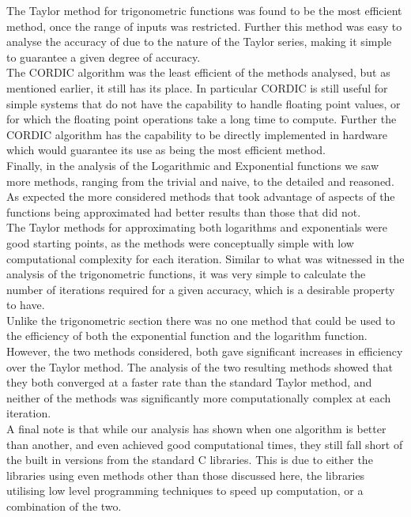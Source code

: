 The Taylor method for trigonometric functions was found to be the most efficient method, once the range of inputs was restricted. Further this method was easy to analyse the accuracy of due to the nature of the Taylor series, making it simple to guarantee a given degree of accuracy.\\

The CORDIC algorithm was the least efficient of the methods analysed, but as mentioned earlier, it still has its place. In particular CORDIC is still useful for simple systems that do not have the capability to handle floating point values, or for which the floating point operations take a long time to compute. Further the CORDIC algorithm has the capability to be directly implemented in hardware which would guarantee its use as being the most efficient method.\\

Finally, in the analysis of the Logarithmic and Exponential functions we saw more methods, ranging from the trivial and naive, to the detailed and reasoned. As expected the more considered methods that took advantage of aspects of the functions being approximated had better results than those that did not.\\

The Taylor methods for approximating both logarithms and exponentials were good starting points, as the methods were conceptually simple with low computational complexity for each iteration. Similar to what was witnessed in the analysis of the trigonometric functions, it was very simple to calculate the number of iterations required for a given accuracy, which is a desirable property to have.\\

Unlike the trigonometric section there was no one method that could be used to the efficiency of both the exponential function and the logarithm function. However, the two methods considered, both gave significant increases in efficiency over the Taylor method. The analysis of the two resulting methods showed that they both converged at a faster rate than the standard Taylor method, and neither of the methods was significantly more computationally complex at each iteration.\\

A final note is that while our analysis has shown when one algorithm is better than another, and even achieved good computational times, they still fall short of the built in versions from the standard C libraries. This is due to either the libraries using even methods other than those discussed here, the libraries utilising low level programming techniques to speed up computation, or a combination of the two.
